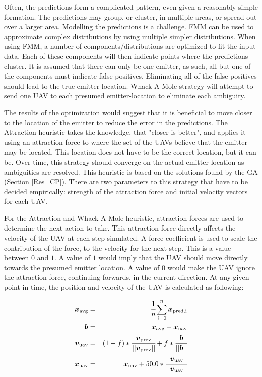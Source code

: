 \documentclass[10pt,a4paper]{book}
\begin{document}
Often, the predictions form a complicated pattern, even given a reasonably simple formation. The predictions may group, or cluster, in multiple areas, or spread out over a larger area. Modelling the predictions is a challenge. \Gls{FMM} can be used to approximate complex distributions by using multiple simpler distributions. When using \gls{FMM}, a number of components/distributions are optimized to fit the input data. Each of these components will then indicate points where the predictions cluster. It is assumed that there can only be one emitter, as such, all but one of the components must indicate false positives. Eliminating all of the false positives should lead to the true emitter-location. Whack-A-Mole strategy will attempt to send one \gls{UAV} to each presumed emitter-location to eliminate each ambiguity.

The results of the optimization would suggest that it is beneficial to move closer to the location of the emitter to reduce the error in the predictions. The Attraction heuristic takes the knowledge, that "closer is better", and applies it using an attraction force to where the set of the \glspl{UAV} believe that the emitter may be located. This location does not have to be the correct location, but it can be. Over time, this strategy should converge on the actual emitter-location as ambiguities are resolved. This heuristic is based on the solutions found by the \gls{GA} (Section \ref{Res_CP}).  There are two parameters to this strategy that have to be decided empirically: strength of the attraction force and initial velocity vectors for each \gls{UAV}. 

For the Attraction and Whack-A-Mole heuristic, attraction forces are used to determine the next action to take. This attraction force directly affects the velocity of the \gls{UAV} at each step simulated. A force coefficient is used to scale the contribution of the force, to the velocity for the next step. This is a value between $0$ and $1$. A value of $1$ would imply that the \gls{UAV} should move directly towards the presumed emitter location. A value of $0$ would make the \gls{UAV} ignore the attraction force, continuing forwards, in the current direction. At any given point in time, the position and velocity of the \gls{UAV} is calculated as following:

\begin{eqnarray}
\boldsymbol{x}_\text{avg} &=& \cfrac{1}{n} \sum_{i=0}^{n} \boldsymbol{x}_\text{pred,i}\nonumber \\
\boldsymbol{b} &=& \boldsymbol{x}_\text{avg} - \boldsymbol{x}_\text{uav} \nonumber \\
\boldsymbol{v}_\text{uav} &=& (1-f) * \cfrac{\boldsymbol{v}_\text{prev}}{||\boldsymbol{v}_\text{prev}||} + f * \cfrac{\boldsymbol{b}}{||\boldsymbol{b}||} \nonumber \\
\boldsymbol{x}_\text{uav} &=&  \boldsymbol{x}_\text{uav} + 50.0 * \cfrac{\boldsymbol{v}_\text{uav}}{||\boldsymbol{v}_\text{uav}||} \nonumber
\end{eqnarray}
\end{document}
